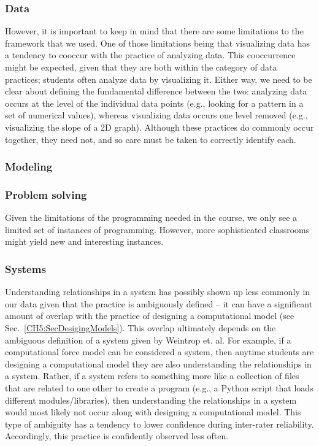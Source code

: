 \documentclass{msuphddissertation}
\begin{document}
\begin{doublespace}
\subsubsection{Data}

However, it is important to keep in mind that there are some limitations to the framework that we used.  One of those limitations being that visualizing data has a tendency to cooccur with the practice of analyzing data.  This cooccurrence might be expected, given that they are both within the category of data practices; students often analyze data by visualizing it.  Either way, we need to be clear about defining the fundamental difference between the two: analyzing data occurs at the level of the individual data points (e.g., looking for a pattern in a set of numerical values), whereas visualizing data occurs one level removed (e.g., visualizing the slope of a 2D graph).  Although these practices do commonly occur together, they need not, and so care must be taken to correctly identify each.

\subsubsection{Modeling}

\subsubsection{Problem solving}

Given the limitations of the programming needed in the course, we only see a limited set of instances of programming.  However, more sophisticated classrooms might yield new and interesting instances.

\subsubsection{Systems}

Understanding relationships in a system has possibly shown up less commonly in our data given that the practice is ambiguously defined -- it can have a significant amount of overlap with the practice of designing a computational model (see Sec.~\ref{CH5:SecDesigingModels}).  This overlap ultimately depends on the ambiguous definition of a system given by Weintrop et. al.  For example, if a computational force model can be considered a system, then anytime students are designing a computational model they are also understanding the relationships in a system.  Rather, if a system refers to something more like a collection of files that are related to one other to create a program (e.g., a Python script that loads different modules/libraries), then understanding the relationships in a system would most likely not occur along with designing a computational model.  This type of ambiguity has a tendency to lower confidence during inter-rater reliability.  Accordingly, this practice is confidently observed less often.


\end{doublespace}
\end{document}
